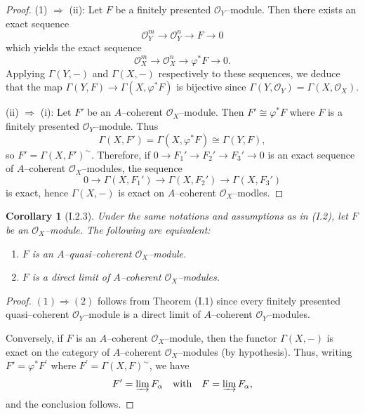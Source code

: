 \documentclass[a4paper]{amsart}
\newtheorem{cor}[theorem]{Corollary}
\theoremstyle{definition}
\theoremstyle{definition}
\begin{document}
\begin{proof}
(1) $\Rightarrow$ (ii): Let $F$ be a finitely presented $\mathcal{O}_Y$–module. Then there exists an exact sequence
\[
\mathcal{O}_Y^m \longrightarrow \mathcal{O}_Y^n \longrightarrow F \longrightarrow 0
\]
which yields the exact sequence
\[
\mathcal{O}_X^m \longrightarrow \mathcal{O}_X^n \longrightarrow \varphi^* F \longrightarrow 0.
\]
Applying $\Gamma(Y, -)$ and $\Gamma(X, -)$ respectively to these sequences, we deduce that the map $\Gamma(Y, F) \to \Gamma(X, \varphi^* F)$ is bijective since $\Gamma(Y, \mathcal{O}_Y) = \Gamma(X, \mathcal{O}_X)$.

(ii) $\Rightarrow$ (i): Let $F'$ be an $A$–coherent $\mathcal{O}_X$–module. Then $F' \cong \varphi^* F$ where $F$ is a finitely presented $\mathcal{O}_Y$–module. Thus
\[
\Gamma(X, F') = \Gamma(X, \varphi^* F) \cong \Gamma(Y, F),
\]
so $F' = \Gamma(X, F')^\sim$. Therefore, if $0 \to F_1' \to F_2' \to F_3' \to 0$ is an exact sequence of $A$–coherent $\mathcal{O}_X$–modules, the sequence
\[
0 \to \Gamma(X, F_1') \to \Gamma(X, F_2') \to \Gamma(X, F_3')
\]
is exact, hence $\Gamma(X, -)$ is exact on $A$–coherent $\mathcal{O}_X$–modles.
\end{proof}


\begin{cor}[I.2.3]
Under the same notations and assumptions as in (I.2), let $F$ be an $\mathcal{O}_X$–module.  
The following are equivalent:
\begin{enumerate}
\item $F$ is an $A$–quasi–coherent $\mathcal{O}_X$–module.
\item $F$ is a direct limit of $A$–coherent $\mathcal{O}_X$–modules.
\end{enumerate}
\end{cor}

\begin{proof}
$(1) \Rightarrow (2)$ follows from Theorem (I.1) since every finitely presented quasi–coherent $\mathcal{O}_Y$–module is a direct limit of $A$–coherent $\mathcal{O}_Y$–modules.  

Conversely, if $F$ is an $A$–coherent $\mathcal{O}_X$–module, then the functor $\Gamma(X, -)$ is exact on the category of $A$–coherent $\mathcal{O}_X$–modules (by hypothesis). Thus, writing $F' = \varphi^* F^\prime$ where $F^\prime = \Gamma(X, F)^\sim$, we have
\[
F' = \varinjlim F_\alpha \quad \text{with} \quad F = \varinjlim F_\alpha,
\]
and the conclusion follows.
\end{proof}
\end{document}
